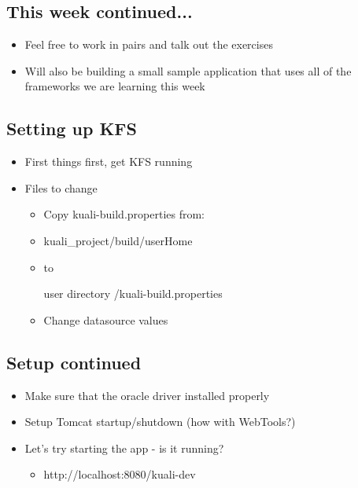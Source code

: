 \documentclass[12pt,notitlepage]{article}
\begin{document}
    \W \begin{s5slide}
        \W \section{This week continued...}
        \begin{ifhtml}
            \begin{itemize}
                \item Feel free to work in pairs and talk out the exercises
                \item Will also be building a small sample application that uses all of the frameworks we are learning this week
            \end{itemize}
        \end{ifhtml} 
    \W \end{s5slide}
    \W \begin{s5slide}
        \W \section{Setting up KFS}
        \begin{ifhtml}
            \begin{itemize}
                \item First things first, get KFS running
                \item Files to change
                \begin{itemize}
                    \item Copy kuali-build.properties from: 
                    \item kuali_project/build/userHome  
                    \item to 
                    \item [user directory]/kuali-build.properties
                    \item Change datasource values
                \end{itemize}
            \end{itemize}
        \end{ifhtml} 
    \W \end{s5slide}
    \W \begin{s5slide}
        \W \section{Setup continued}
        \begin{ifhtml}
            \begin{itemize}
                \item Make sure that the oracle driver installed properly
                \item Setup Tomcat startup/shutdown (how with WebTools?)
                \item Let's try starting the app - is it running?
                \begin{itemize}
                    \item http://localhost:8080/kuali-dev
                \end{itemize}
            \end{itemize}
        \end{ifhtml} 
    \W \end{s5slide}
\end{document}
